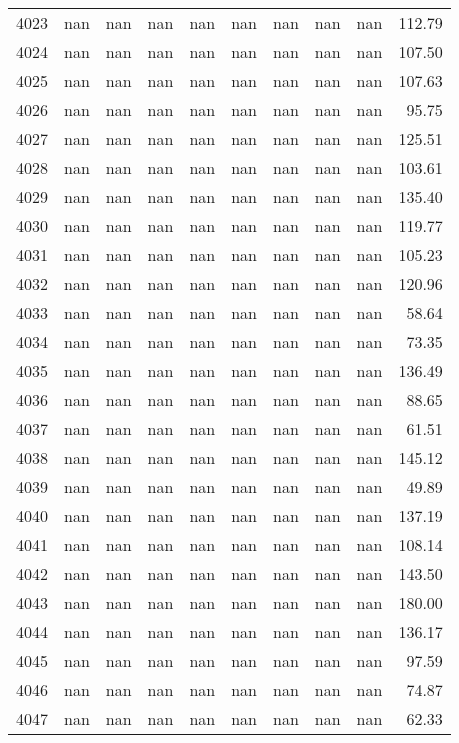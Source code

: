 \begin{tabular}{lrrrrrrrrr}
4023 & nan & nan & nan & nan & nan & nan & nan & nan & 112.79 \\
4024 & nan & nan & nan & nan & nan & nan & nan & nan & 107.50 \\
4025 & nan & nan & nan & nan & nan & nan & nan & nan & 107.63 \\
4026 & nan & nan & nan & nan & nan & nan & nan & nan & 95.75 \\
4027 & nan & nan & nan & nan & nan & nan & nan & nan & 125.51 \\
4028 & nan & nan & nan & nan & nan & nan & nan & nan & 103.61 \\
4029 & nan & nan & nan & nan & nan & nan & nan & nan & 135.40 \\
4030 & nan & nan & nan & nan & nan & nan & nan & nan & 119.77 \\
4031 & nan & nan & nan & nan & nan & nan & nan & nan & 105.23 \\
4032 & nan & nan & nan & nan & nan & nan & nan & nan & 120.96 \\
4033 & nan & nan & nan & nan & nan & nan & nan & nan & 58.64 \\
4034 & nan & nan & nan & nan & nan & nan & nan & nan & 73.35 \\
4035 & nan & nan & nan & nan & nan & nan & nan & nan & 136.49 \\
4036 & nan & nan & nan & nan & nan & nan & nan & nan & 88.65 \\
4037 & nan & nan & nan & nan & nan & nan & nan & nan & 61.51 \\
4038 & nan & nan & nan & nan & nan & nan & nan & nan & 145.12 \\
4039 & nan & nan & nan & nan & nan & nan & nan & nan & 49.89 \\
4040 & nan & nan & nan & nan & nan & nan & nan & nan & 137.19 \\
4041 & nan & nan & nan & nan & nan & nan & nan & nan & 108.14 \\
4042 & nan & nan & nan & nan & nan & nan & nan & nan & 143.50 \\
4043 & nan & nan & nan & nan & nan & nan & nan & nan & 180.00 \\
4044 & nan & nan & nan & nan & nan & nan & nan & nan & 136.17 \\
4045 & nan & nan & nan & nan & nan & nan & nan & nan & 97.59 \\
4046 & nan & nan & nan & nan & nan & nan & nan & nan & 74.87 \\
4047 & nan & nan & nan & nan & nan & nan & nan & nan & 62.33 \\

\end{tabular}
